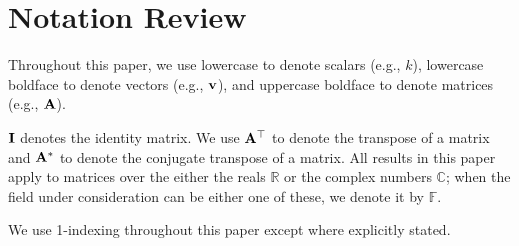 \section{Notation Review}
Throughout this paper, we use lowercase to denote scalars (e.g., $k$), lowercase boldface to denote vectors (e.g., $\mathbf{v}$), and uppercase boldface to denote matrices (e.g., $\mathbf{A}$).

$\mathbf{I}$ denotes the identity matrix. We use $\mathbf{A}^\top$ to denote the transpose of a matrix and $\mathbf{A}^*$ to denote the conjugate transpose of a matrix. All results in this paper apply to matrices over the either the reals $\mathbb{R}$ or the complex numbers $\mathbb{C}$; when the field under consideration can be either one of these, we denote it by $\mathbb{F}$.

We use 1-indexing throughout this paper except where explicitly stated.